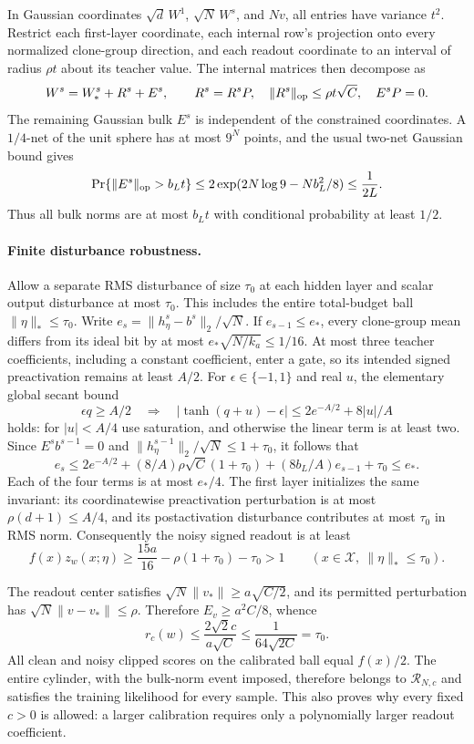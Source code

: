 \documentclass[11pt]{article}
\begin{document}
In Gaussian coordinates $\sqrt d\,W^1$, $\sqrt N\,W^s$, and $Nv$, all
entries have variance $t^2$. Restrict each first-layer coordinate, each
internal row's projection onto every normalized clone-group direction, and
each readout coordinate to an interval of radius $\rho t$ about its teacher
value. The internal matrices then decompose as
\[
 W^s=W_*^s+R^s+E^s,\qquad
 R^s=R^sP,\quad \|R^s\|_{\rm op}\le\rho t\sqrt C,
 \quad E^sP=0.
\]
The remaining Gaussian bulk $E^s$ is independent of the constrained
coordinates. A $1/4$-net of the unit sphere has at most $9^N$ points,
and the usual two-net Gaussian bound gives
\[
 \Pr\{\|E^s\|_{\rm op}>b_Lt\}
 \le2\exp(2N\log9-Nb_L^2/8)\le\frac1{2L}.
\]
Thus all bulk norms are at most $b_Lt$ with conditional probability at
least $1/2$.

\paragraph{Finite disturbance robustness.}
Allow a separate RMS disturbance of size $\tau_0$ at each hidden layer and
scalar output disturbance at most $\tau_0$. This includes the entire
total-budget ball $\|\eta\|_*\le\tau_0$.
Write $e_s=\|h^s_\eta-b^s\|_2/\sqrt N$.
If $e_{s-1}\le e_*$, every clone-group mean differs from its ideal bit by
at most $e_*\sqrt{N/k_a}\le1/16$. At most three teacher coefficients,
including a constant coefficient, enter a gate, so its intended signed
preactivation remains at least $A/2$.
For $\epsilon\in\{-1,1\}$ and real $u$, the elementary global secant bound
\[
 \epsilon q\ge A/2
 \quad\Longrightarrow\quad
 |\tanh(q+u)-\epsilon|\le2e^{-A/2}+8|u|/A
\]
holds: for $|u|<A/4$ use saturation, and otherwise the linear term is at
least two. Since $E^sb^{s-1}=0$ and
$\|h^{s-1}_\eta\|_2/\sqrt N\le1+\tau_0$, it follows that
\[
 e_s\le2e^{-A/2}+
          (8/A)\rho\sqrt C(1+\tau_0)
          +(8b_L/A)e_{s-1}+\tau_0\le e_*.
\]
Each of the four terms is at most $e_*/4$.
The first layer initializes the same invariant: its coordinatewise
preactivation perturbation is at most $\rho(d+1)\le A/4$, and its
postactivation disturbance contributes at most $\tau_0$ in RMS norm.
Consequently the noisy signed readout is at least
\[
 f(x)z_w(x;\eta)
 \ge\frac{15a}{16}-\rho(1+\tau_0)-\tau_0>1
 \qquad(x\in\mathcal X,\ \|\eta\|_*\le\tau_0).
\]

The readout center satisfies $\sqrt N\|v_*\|\ge a\sqrt{C/2}$, and its
permitted perturbation has $\sqrt N\|v-v_*\|\le\rho$.
Therefore $E_v\ge a^2C/8$, whence
\[
 r_c(w)\le\frac{2\sqrt2c}{a\sqrt C}
       \le\frac1{64\sqrt{2C}}=\tau_0.
\]
All clean and noisy clipped scores on the calibrated ball equal $f(x)/2$.
The entire cylinder, with the bulk-norm event imposed, therefore belongs
to $\mathcal R_{N,c}$ and satisfies the training likelihood for every sample.
This also proves why every fixed $c>0$ is allowed: a larger calibration
requires only a polynomially larger readout coefficient.
\end{document}
